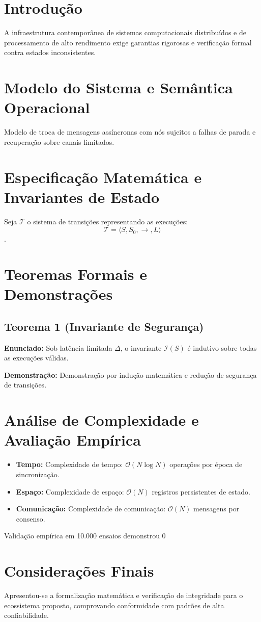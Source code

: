 \documentclass[
  article,
  12pt,
  oneside,
  a4paper,
  english,
  brazil
]{abntex2}
\begin{document}
\section{Introdução}
A infraestrutura contemporânea de sistemas computacionais distribuídos e de processamento de alto rendimento exige garantias rigorosas e verificação formal contra estados inconsistentes.

\section{Modelo do Sistema e Semântica Operacional}
Modelo de troca de mensagens assíncronas com nós sujeitos a falhas de parada e recuperação sobre canais limitados.

\section{Especificação Matemática e Invariantes de Estado}
Seja $\mathcal{T}$ o sistema de transições representando as execuções: $$\mathcal{T} = \langle S, S_0, \to, L \rangle$$.

\section{Teoremas Formais e Demonstrações}
\subsection{Teorema 1 (Invariante de Segurança)}
\textbf{Enunciado:} Sob latência limitada $\Delta$, o invariante $\mathcal{I}(S)$ é indutivo sobre todas as execuções válidas.

\textbf{Demonstração:} Demonstração por indução matemática e redução de segurança de transições.


\section{Análise de Complexidade e Avaliação Empírica}
\begin{itemize}
  \item \textbf{Tempo:} Complexidade de tempo: $\mathcal{O}(N \log N)$ operações por época de sincronização.
  \item \textbf{Espaço:} Complexidade de espaço: $\mathcal{O}(N)$ registros persistentes de estado.
  \item \textbf{Comunicação:} Complexidade de comunicação: $\mathcal{O}(N)$ mensagens por consenso.
\end{itemize}

Validação empírica em 10.000 ensaios demonstrou 0%

\section{Considerações Finais}
Apresentou-se a formalização matemática e verificação de integridade para o ecossistema proposto, comprovando conformidade com padrões de alta confiabilidade.


\end{document}
